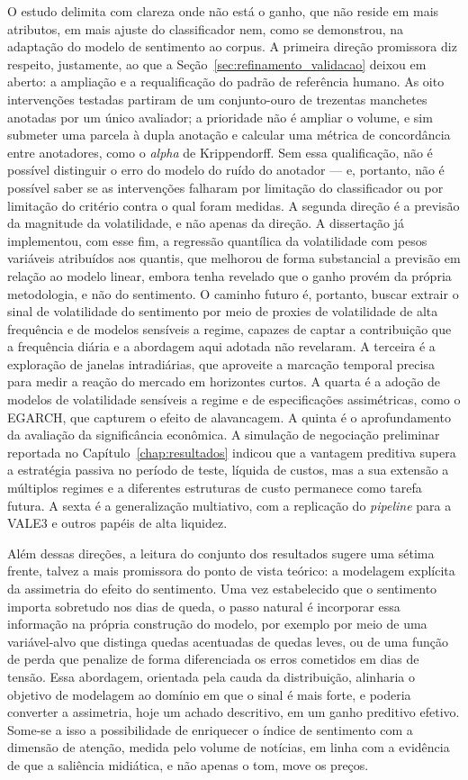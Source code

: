 O estudo delimita com clareza onde não está o ganho, que não reside em mais atributos, em mais ajuste do classificador nem, como se demonstrou, na adaptação do modelo de sentimento ao corpus. A primeira direção promissora diz respeito, justamente, ao que a Seção~\ref{sec:refinamento_validacao} deixou em aberto: a ampliação e a requalificação do padrão de referência humano. As oito intervenções testadas partiram de um conjunto-ouro de trezentas manchetes anotadas por um único avaliador; a prioridade não é ampliar o volume, e sim submeter uma parcela à dupla anotação e calcular uma métrica de concordância entre anotadores, como o \textit{alpha} de Krippendorff. Sem essa qualificação, não é possível distinguir o erro do modelo do ruído do anotador --- e, portanto, não é possível saber se as intervenções falharam por limitação do classificador ou por limitação do critério contra o qual foram medidas. A segunda direção é a previsão da magnitude da volatilidade, e não apenas da direção. A dissertação já implementou, com esse fim, a regressão quantílica da volatilidade com pesos variáveis atribuídos aos quantis, que melhorou de forma substancial a previsão em relação ao modelo linear, embora tenha revelado que o ganho provém da própria metodologia, e não do sentimento. O caminho futuro é, portanto, buscar extrair o sinal de volatilidade do sentimento por meio de proxies de volatilidade de alta frequência e de modelos sensíveis a regime, capazes de captar a contribuição que a frequência diária e a abordagem aqui adotada não revelaram. A terceira é a exploração de janelas intradiárias, que aproveite a marcação temporal precisa para medir a reação do mercado em horizontes curtos. A quarta é a adoção de modelos de volatilidade sensíveis a regime e de especificações assimétricas, como o EGARCH, que capturem o efeito de alavancagem. A quinta é o aprofundamento da avaliação da significância econômica. A simulação de negociação preliminar reportada no Capítulo~\ref{chap:resultados} indicou que a vantagem preditiva supera a estratégia passiva no período de teste, líquida de custos, mas a sua extensão a múltiplos regimes e a diferentes estruturas de custo permanece como tarefa futura. A sexta é a generalização multiativo, com a replicação do \textit{pipeline} para a VALE3 e outros papéis de alta liquidez.

Além dessas direções, a leitura do conjunto dos resultados sugere uma sétima frente, talvez a mais promissora do ponto de vista teórico: a modelagem explícita da assimetria do efeito do sentimento. Uma vez estabelecido que o sentimento importa sobretudo nos dias de queda, o passo natural é incorporar essa informação na própria construção do modelo, por exemplo por meio de uma variável-alvo que distinga quedas acentuadas de quedas leves, ou de uma função de perda que penalize de forma diferenciada os erros cometidos em dias de tensão. Essa abordagem, orientada pela cauda da distribuição, alinharia o objetivo de modelagem ao domínio em que o sinal é mais forte, e poderia converter a assimetria, hoje um achado descritivo, em um ganho preditivo efetivo. Some-se a isso a possibilidade de enriquecer o índice de sentimento com a dimensão de atenção, medida pelo volume de notícias, em linha com a evidência de que a saliência midiática, e não apenas o tom, move os preços.


